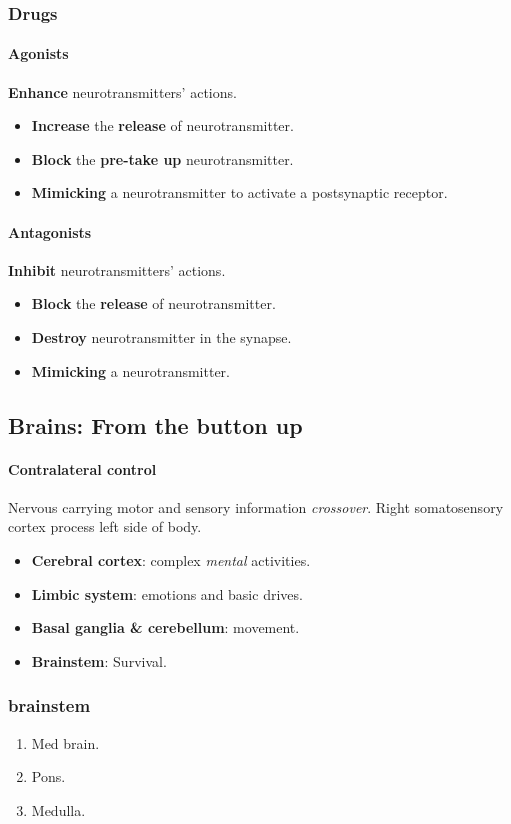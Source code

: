 \documentclass{article}
\begin{document}
	\subsubsection{Drugs}
	\paragraph{Agonists} \textbf{Enhance} neurotransmitters' actions.
	\begin{itemize}
		\item \textbf{Increase} the \textbf{release} of neurotransmitter.
		\item \textbf{Block} the \textbf{pre-take up} neurotransmitter.
		\item \textbf{Mimicking} a neurotransmitter to activate a postsynaptic receptor.
	\end{itemize}
	\paragraph{Antagonists} \textbf{Inhibit} neurotransmitters' actions.
	\begin{itemize}
		\item \textbf{Block} the \textbf{release} of neurotransmitter.
		\item \textbf{Destroy} neurotransmitter in the synapse.
		\item \textbf{Mimicking} a neurotransmitter.
	\end{itemize}
	\subsection{Brains: From the button up}
	\paragraph{Contralateral control} Nervous carrying motor and sensory information \emph{crossover}.
	\newline Right somatosensory cortex process left side of body.
	\begin{itemize}
		\item \textbf{Cerebral cortex}: complex \emph{mental} activities.
		\item \textbf{Limbic system}: emotions and basic drives.
		\item \textbf{Basal ganglia \& cerebellum}: movement.
		\item \textbf{Brainstem}: Survival.
	\end{itemize}
	\subsubsection{brainstem}
	\begin{enumerate}
		\item Med brain.
		\item Pons.
		\item Medulla.
	\end{enumerate}
\end{document}
